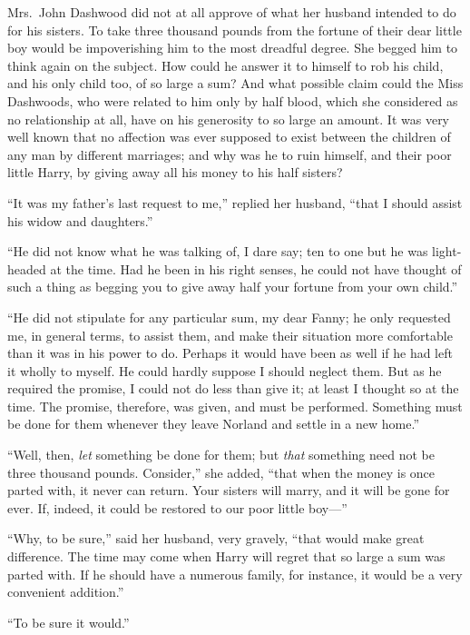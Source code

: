 \documentclass{article}
\begin{document}
Mrs.\ John Dashwood did not at all approve of what her
husband intended to do for his sisters.  To take three
thousand pounds from the fortune of their dear little boy
would be impoverishing him to the most dreadful degree.
She begged him to think again on the subject.  How could
he answer it to himself to rob his child, and his only
child too, of so large a sum?  And what possible claim
could the Miss Dashwoods, who were related to him only by
half blood, which she considered as no relationship at all,
have on his generosity to so large an amount.  It was very
well known that no affection was ever supposed to exist
between the children of any man by different marriages;
and why was he to ruin himself, and their poor little Harry,
by giving away all his money to his half sisters?

``It was my father's last request to me,'' replied
her husband, ``that I should assist his widow and daughters.''

``He did not know what he was talking of, I dare say;
ten to one but he was light-headed at the time.
Had he been in his right senses, he could not have thought
of such a thing as begging you to give away half your
fortune from your own child.''

``He did not stipulate for any particular sum,
my dear Fanny; he only requested me, in general terms,
to assist them, and make their situation more comfortable
than it was in his power to do.  Perhaps it would
have been as well if he had left it wholly to myself.
He could hardly suppose I should neglect them.
But as he required the promise, I could not do less
than give it; at least I thought so at the time.
The promise, therefore, was given, and must be performed.
Something must be done for them whenever they leave Norland
and settle in a new home.''

``Well, then, \emph{let} something be done for them;
but \emph{that} something need not be three thousand pounds.
Consider,'' she added, ``that when the money is once
parted with, it never can return.  Your sisters will marry,
and it will be gone for ever.  If, indeed, it could
be restored to our poor little boy---''

``Why, to be sure,'' said her husband, very gravely,
``that would make great difference.  The time may come when
Harry will regret that so large a sum was parted with.
If he should have a numerous family, for instance, it would
be a very convenient addition.''

``To be sure it would.''
\end{document}
